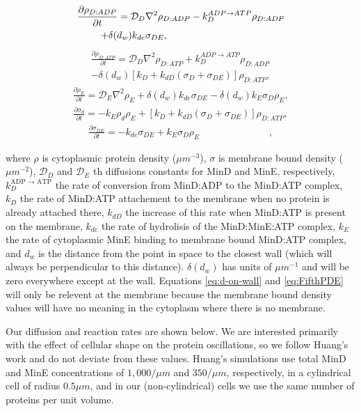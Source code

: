 \documentclass[letterpaper,twocolumn,amsmath,amssymb,pre]{revtex4-1}
\begin{document}
\begin{multline}
  \frac{\partial \rho_{D:ADP}}{\partial t} = \mathcal{D}_D\nabla^2\rho_{D:ADP}-k_D^{ADP\rightarrow ATP}\rho_{D:ADP}\\
  +\delta(d_w)k_{de}\sigma_{DE},\hspace{3.4cm}
\end{multline}
\begin{multline}
  \frac{\partial \rho_{D:ATP}}{\partial t} = \mathcal{D}_D\nabla^2\rho_{D:ATP}+k_D^{ADP\rightarrow ATP}\rho_{D:ADP}\\
  -\delta(d_w)[k_D+k_{dD}(\sigma_D+\sigma_{DE})]\rho_{D:ATP},
\end{multline}
\begin{multline}
  \frac{\partial \rho_E}{\partial t} = \mathcal{D}_E\nabla^2\rho_E+\delta(d_w)k_{de}\sigma_{DE}
  -\delta(d_w)k_E \sigma_D \rho_E,
\end{multline}
\begin{multline}
  \frac{\partial \sigma_d}{\partial t} = -k_E\rho_d\rho_E
  +[k_D+k_{dD}(\sigma_D+\sigma_{DE})]\rho_{D:ATP},
  \label{eq:d-on-wall}
\end{multline}
\begin{multline}
  \frac{\partial \sigma_{DE}}{\partial t} = -k_{de}\sigma_{DE}+k_E\sigma_D\rho_E\hspace{3cm}
  \label{eq:FifthPDE},
\end{multline}

where $\rho$ is cytoplasmic protein density ($\mu m^{-3}$), $\sigma$
is membrane bound density ($\mu m^{-2}$), $\mathcal{D}_D$ and
$\mathcal{D}_{E}$ th diffusions constants for MinD and MinE,
respectively, $k_D^{\textrm{ADP $\rightarrow$ ATP}}$ the rate of
conversion from MinD:ADP to the MinD:ATP complex, $k_D$ the rate of
MinD:ATP attachement to the membrane when no protein is already
attached there, $k_{dD}$ the increase of this rate when MinD:ATP is
present on the membrane, $k_{de}$ the rate of hydrolisis of the
MinD:MinE:ATP complex, $k_E$ the rate of cytoplasmic MinE binding to
membrane bound MinD:ATP complex, and $d_w$ is the distance from the
point in space to the closest wall (which will always be
perpendicular to this distance).  $\delta(d_w)$ has units of
$\mu m^{-1}$ and will be zero everywhere except at the wall.
Equations \ref{eq:d-on-wall} and \ref{eq:FifthPDE} will only be
relevent at the membrane because the membrane bound density values
will have no meaning in the cytoplasm where there is no membrane.

Our diffusion and reaction rates are shown below.  We are interested
primarily with the effect of cellular shape on the protein
oscillations, so we follow Huang's work\cite{huang2003dynamic} and do
not deviate from these values.  Huang's simulations use total MinD and
MinE concentrations of $1,000/\mu m$ and $350/\mu m$, respectively, in
a cylindrical cell of radius $0.5\mu m$, and in our (non-cylindrical)
cells we use the same number of proteins per unit volume.
\end{document}
